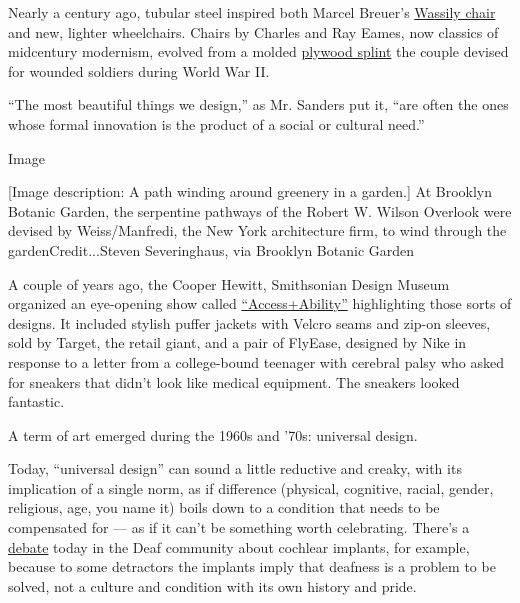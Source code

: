 Nearly a century ago, tubular steel inspired both Marcel Breuer's
\href{https://www.knoll.com/product/wassily-chair}{Wassily chair} and
new, lighter wheelchairs. Chairs by Charles and Ray Eames, now classics
of midcentury modernism, evolved from a molded
\href{https://hyperallergic.com/328930/leg-splint-shaped-iconic-eames-chair/}{plywood
splint} the couple devised for wounded soldiers during World War II.

``The most beautiful things we design,'' as Mr. Sanders put it, ``are
often the ones whose formal innovation is the product of a social or
cultural need.''

Image

{[}Image description: A path winding around greenery in a garden.{]} At
Brooklyn Botanic Garden, the serpentine pathways of the Robert W. Wilson
Overlook were devised by Weiss/Manfredi, the New York architecture firm,
to wind through the gardenCredit...Steven Severinghaus, via Brooklyn
Botanic Garden

A couple of years ago, the Cooper Hewitt, Smithsonian Design Museum
organized an eye-opening show called
\href{https://www.nytimes.com/2018/01/24/arts/design/cooper-hewitt-access-ability.html}{``Access+Ability''}
highlighting those sorts of designs. It included stylish puffer jackets
with Velcro seams and zip-on sleeves, sold by Target, the retail giant,
and a pair of FlyEase, designed by Nike in response to a letter from a
college-bound teenager with cerebral palsy who asked for sneakers that
didn't look like medical equipment. The sneakers looked fantastic.

A term of art emerged during the 1960s and '70s: universal design.

Today, ``universal design'' can sound a little reductive and creaky,
with its implication of a single norm, as if difference (physical,
cognitive, racial, gender, religious, age, you name it) boils down to a
condition that needs to be compensated for --- as if it can't be
something worth celebrating. There's a
\href{https://www.ncbi.nlm.nih.gov/pmc/articles/PMC6913847/\#:~:text=an\%20inspirational\%20video\%3F-,Sensationalizing\%20Cochlear\%20Implants,\%E2\%80\%9Cmiracle\%20cure\%E2\%80\%9D\%20for\%20deafness.\&text=When\%20the\%20implant\%20is\%20first,sudden\%20flood\%20of\%20sensory\%20inputs.}{debate}
today in the Deaf community about cochlear implants, for example,
because to some detractors the implants imply that deafness is a problem
to be solved, not a culture and condition with its own history and
pride.

